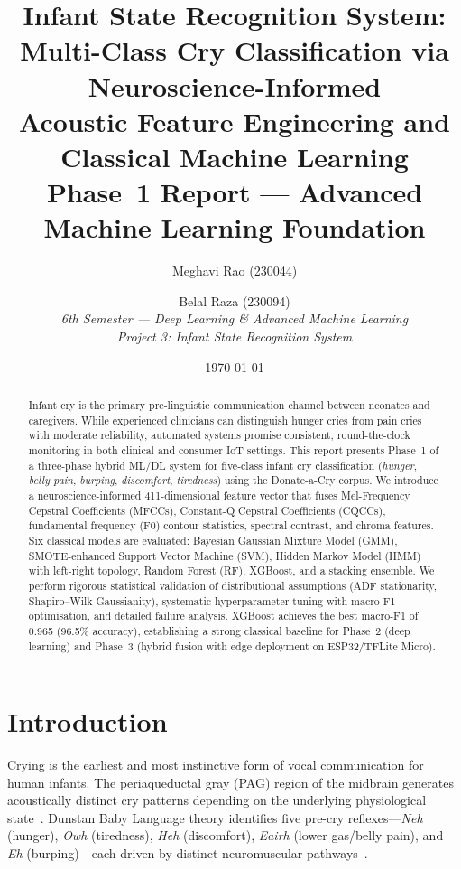 \documentclass[11pt,a4paper]{article}
\title{%
  \textbf{Infant State Recognition System}:\\[4pt]
  \textbf{Multi-Class Cry Classification via Neuroscience-Informed}\\
  \textbf{Acoustic Feature Engineering and Classical Machine Learning}\\[10pt]
  \large Phase~1 Report --- Advanced Machine Learning Foundation
}
\author{
  Meghavi Rao (230044) \and Belal Raza (230094) \\[4pt]
  \textit{6th Semester --- Deep Learning \& Advanced Machine Learning} \\
  \textit{Project 3: Infant State Recognition System}
}
\date{\today}
\begin{document}
\maketitle

\begin{abstract}
Infant cry is the primary pre-linguistic communication channel between
neonates and caregivers. While experienced clinicians can distinguish
hunger cries from pain cries with moderate reliability, automated
systems promise consistent, round-the-clock monitoring in both clinical
and consumer IoT settings. This report presents Phase~1 of a
three-phase hybrid ML/DL system for five-class infant cry
classification (\textit{hunger}, \textit{belly pain}, \textit{burping},
\textit{discomfort}, \textit{tiredness}) using the Donate-a-Cry corpus.
We introduce a neuroscience-informed 411-dimensional feature vector that
fuses Mel-Frequency Cepstral Coefficients (MFCCs), Constant-Q Cepstral
Coefficients (CQCCs), fundamental frequency (F0) contour statistics,
spectral contrast, and chroma features. Six classical models are
evaluated: Bayesian Gaussian Mixture Model (GMM), SMOTE-enhanced Support
Vector Machine (SVM), Hidden Markov Model (HMM) with left-right
topology, Random Forest (RF), XGBoost, and a stacking ensemble. We
perform rigorous statistical validation of distributional assumptions
(ADF stationarity, Shapiro--Wilk Gaussianity), systematic
hyperparameter tuning with macro-F1 optimisation, and detailed failure
analysis. XGBoost achieves the best macro-F1 of 0.965 (96.5\% accuracy),
establishing a strong classical baseline for Phase~2 (deep learning) and
Phase~3 (hybrid fusion with edge deployment on ESP32/TFLite Micro).
\end{abstract}

\section{Introduction}
\label{sec:intro}

Crying is the earliest and most instinctive form of vocal communication
for human infants. The periaqueductal gray (PAG) region of the midbrain
generates acoustically distinct cry patterns depending on the underlying
physiological state~\cite{newman2007cry}. Dunstan Baby Language theory
identifies five pre-cry reflexes---\textit{Neh} (hunger),
\textit{Owh} (tiredness), \textit{Heh} (discomfort),
\textit{Eairh} (lower gas/belly pain), and \textit{Eh}
(burping)---each driven by distinct neuromuscular
pathways~\cite{dunstan2006}.
\end{document}
